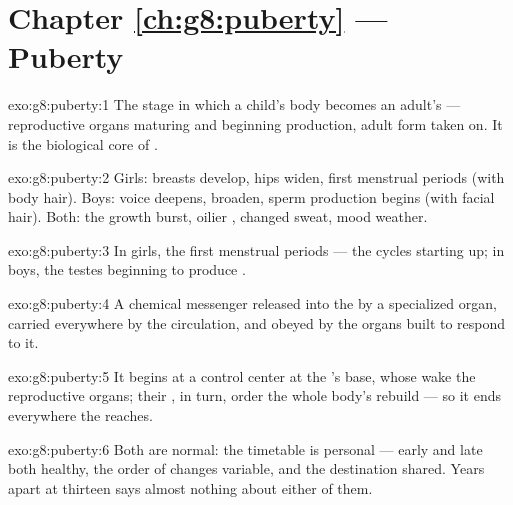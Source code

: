 \section*{Chapter \ref{ch:g8:puberty} --- Puberty}

\begin{solution}{exo:g8:puberty:1}
The stage in which a child's body becomes an adult's ---
reproductive organs maturing and beginning 
production, adult form taken on. It is the biological core
of .
\end{solution}

\begin{solution}{exo:g8:puberty:2}
Girls: breasts develop, hips widen, first menstrual
periods (with body hair). Boys: voice deepens, 
broaden, sperm production begins (with facial hair). Both:
the growth burst, oilier , changed sweat, mood
weather.
\end{solution}

\begin{solution}{exo:g8:puberty:3}
In girls, the first menstrual periods --- the cycles
starting up; in boys, the testes beginning to produce
.
\end{solution}

\begin{solution}{exo:g8:puberty:4}
A chemical messenger released into the  by a
specialized organ, carried everywhere by the circulation,
and obeyed by the organs built to respond to it.
\end{solution}

\begin{solution}{exo:g8:puberty:5}
It begins at a control center at the 's base, whose
 wake the reproductive organs; their , in
turn, order the whole body's rebuild --- so it ends
everywhere the  reaches.
\end{solution}

\begin{solution}{exo:g8:puberty:6}
Both are normal: the timetable is personal --- early and
late both healthy, the order of changes variable, and the
destination shared. Years apart at thirteen says almost
nothing about either of them.
\end{solution}

